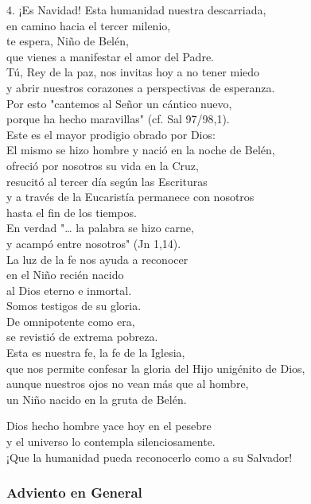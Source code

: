 4. ¡Es Navidad! Esta humanidad nuestra descarriada,\\
en camino hacia el tercer milenio,\\
te espera, Niño de Belén,\\
que vienes a manifestar el amor del Padre.\\
Tú, Rey de la paz, nos invitas hoy a no tener miedo\\
y abrir nuestros corazones a perspectivas de esperanza.\\
Por esto "cantemos al Señor un cántico nuevo,\\
porque ha hecho maravillas" (cf. Sal 97/98,1).\\
Este es el mayor prodigio obrado por Dios:\\
El mismo se hizo hombre y nació en la noche de Belén,\\
ofreció por nosotros su vida en la Cruz,\\
resucitó al tercer día según las Escrituras\\
y a través de la Eucaristía permanece con nosotros\\
hasta el fin de los tiempos.\\
En verdad "\ldots{} la palabra se hizo carne,\\
y acampó entre nosotros" (Jn 1,14).\\
La luz de la fe nos ayuda a reconocer\\
en el Niño recién nacido\\
al Dios eterno e inmortal.\\
Somos testigos de su gloria.\\
De omnipotente como era,\\
se revistió de extrema pobreza.\\
Esta es nuestra fe, la fe de la Iglesia,\\
que nos permite confesar la gloria del Hijo unigénito de Dios,\\
aunque nuestros ojos no vean más que al hombre,\\
un Niño nacido en la gruta de Belén.

Dios hecho hombre yace hoy en el pesebre\\
y el universo lo contempla silenciosamente.\\
¡Que la humanidad pueda reconocerlo como a su Salvador!


\subsubsection{Adviento en General}


